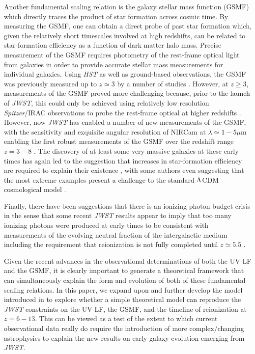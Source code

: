 \documentclass[fleqn,usenatbib]{mnras}
\begin{document}
Another fundamental scaling relation is the galaxy stellar mass function (GSMF) which directly traces the product of star formation across cosmic time. By measuring the GSMF, one can obtain a direct probe of past star formation which, given the relatively short timescales involved at high redshifts, can be related to star-formation efficiency as a function of dark matter halo mass. Precise measurement of the GSMF requires photometry of the rest-frame optical light from galaxies in order to provide accurate stellar mass measurements for individual galaxies. Using \textit{HST} as well as ground-based observations, the GSMF was previously measured up to $z\simeq 3$ by a number of studies \citep[e.g.][]{muzzin2013,mortlock2015, mcleod2021,weaver2023}. However, at $z\geq3$, measurements of the GSMF proved more challenging because, prior to the launch of \textit{JWST}, this could only be achieved using relatively low resolution \textit{Spitzer}/IRAC observations to probe the rest-frame optical at higher redshifts \citep[e.g.][]{grazian2015,song2016,stefanon2021}. However, now \textit{JWST} has enabled a number of new measurements of the GSMF, with the sensitivity and exquisite angular resolution of NIRCam at $\lambda\simeq1-5\mu$m enabling the first robust measurements of the GSMF over the redshift range $z=3-8$ \citep{weibel2024,harvey2024,shuntov2024}. The discovery of at least some very massive galaxies at these early times has again led to the suggestion that increases in star-formation efficiency are required to explain their existence \citep[e.g. $\epsilon\sim0.2$;][]{chworowsky2024}, with some authors even suggesting that the most extreme examples present a challenge to the standard $\rm \Lambda$CDM cosmological model \citep[e.g. $\epsilon\sim0.8-1.0$;][]{labbe2023,glazebrook2024,shuntov2024}. 

Finally, there have been suggestions that there is an ionizing photon budget crisis \citep{munoz2024} in the sense that some recent \textit{JWST} results appear to imply that too many ionizing photons were produced at early times to be consistent with measurements of the evolving neutral fraction of the intergalactic medium \citep[e.g.][]{tang2024,nakane2024} including the requirement that reionization is not fully completed until $z\simeq5.5$ \citep{bosman2021}.

Given the recent advances in the observational determinations of both the UV LF and the GSMF, it is clearly important to generate a theoretical framework that can simultaneously explain the form and evolution of both of these fundamental scaling relations. In this paper, we expand upon and further develop the model introduced in \citet{donnan2024} to explore whether a simple theoretical model can reproduce the \textit{JWST} constraints on the UV LF, the GSMF, and the timeline of reionization at $z=6-13$. This can be viewed as a test of the extent to which current observational data really do require the introduction of more complex/changing astrophysics to explain the new results on early galaxy evolution emerging from \textit{JWST}. 
\end{document}

